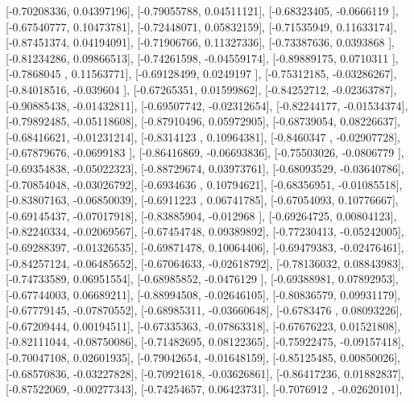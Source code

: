 \documentclass{article}
\begin{document}
       [-0.70208336,  0.04397196],
       [-0.79055788,  0.04511121],
       [-0.68323405, -0.0666119 ],
       [-0.67540777,  0.10473781],
       [-0.72448071,  0.05832159],
       [-0.71535949,  0.11633174],
       [-0.87451374,  0.04194091],
       [-0.71906766,  0.11327336],
       [-0.73387636,  0.0393868 ],
       [-0.81234286,  0.09866513],
       [-0.74261598, -0.04559174],
       [-0.89889175,  0.0710311 ],
       [-0.7868045 ,  0.11563771],
       [-0.69128499,  0.0249197 ],
       [-0.75312185, -0.03286267],
       [-0.84018516, -0.039604  ],
       [-0.67265351,  0.01599862],
       [-0.84252712, -0.02363787],
       [-0.90885438, -0.01432811],
       [-0.69507742, -0.02312654],
       [-0.82244177, -0.01534374],
       [-0.79892485, -0.05118608],
       [-0.87910496,  0.05972905],
       [-0.68739054,  0.08226637],
       [-0.68416621, -0.01231214],
       [-0.8314123 ,  0.10964381],
       [-0.8460347 , -0.02907728],
       [-0.67879676, -0.0699183 ],
       [-0.86416869, -0.06693836],
       [-0.75503026, -0.0806779 ],
       [-0.69354838, -0.05022323],
       [-0.88729674,  0.03973761],
       [-0.68093529, -0.03640786],
       [-0.70854048, -0.03026792],
       [-0.6934636 ,  0.10794621],
       [-0.68356951, -0.01085518],
       [-0.83807163, -0.06850039],
       [-0.6911223 ,  0.06741785],
       [-0.67054093,  0.10776667],
       [-0.69145437, -0.07017918],
       [-0.83885904, -0.012968  ],
       [-0.69264725,  0.00804123],
       [-0.82240334, -0.02069567],
       [-0.67454748,  0.09389892],
       [-0.77230413, -0.05242005],
       [-0.69288397, -0.01326535],
       [-0.69871478,  0.10064406],
       [-0.69479383, -0.02476461],
       [-0.84257124, -0.06485652],
       [-0.67064633, -0.02618792],
       [-0.78136032,  0.08843983],
       [-0.74733589,  0.06951554],
       [-0.68985852, -0.0476129 ],
       [-0.69388981,  0.07892953],
       [-0.67744003,  0.06689211],
       [-0.88994508, -0.02646105],
       [-0.80836579,  0.09931179],
       [-0.67779145, -0.07870552],
       [-0.68985311, -0.03660648],
       [-0.6783476 ,  0.08093226],
       [-0.67209444,  0.00194511],
       [-0.67335363, -0.07863318],
       [-0.67676223,  0.01521808],
       [-0.82111044, -0.08750086],
       [-0.71482695,  0.08122365],
       [-0.75922475, -0.09157418],
       [-0.70047108,  0.02601935],
       [-0.79042654, -0.01648159],
       [-0.85125485,  0.00850026],
       [-0.68570836, -0.03227828],
       [-0.70921618, -0.03626861],
       [-0.86417236,  0.01882837],
       [-0.87522069, -0.00277343],
       [-0.74254657,  0.06423731],
       [-0.7076912 , -0.02620101],
\end{document}
